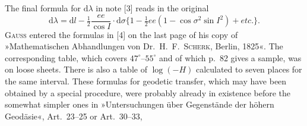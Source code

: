 {The final formula for $\mathrm d\lambda$ in note [3] reads in the original
\[
\mathrm d\lambda=\mathrm dl-\tfrac12\frac{ee}{\cos I}\cdot\mathrm d\sigma\{1-\tfrac12ee(1-\cos\sigma^2\sin I^2)+etc.\}.
\]
\textsc{Gauss} entered the formulas in [4] on the last page of his copy of »Mathematischen Abhandlungen von Dr.\ H.\ F.\ \textsc{Scherk}, Berlin, 1825«. The corresponding table, which covers $47^\circ$--$55^\circ$ and of which p.\ 82 gives a sample, was on loose sheets. There is also a table of $\log(-H)$ calculated to seven places for the same interval. These formulas for geodetic transfer, which may have been obtained by a special procedure, were probably already in existence before the somewhat simpler ones in »Untersuchungen über Gegenstände der höhern Geodäsie«, Art.\ 23--25 or Art.\ 30--33,
\par}

